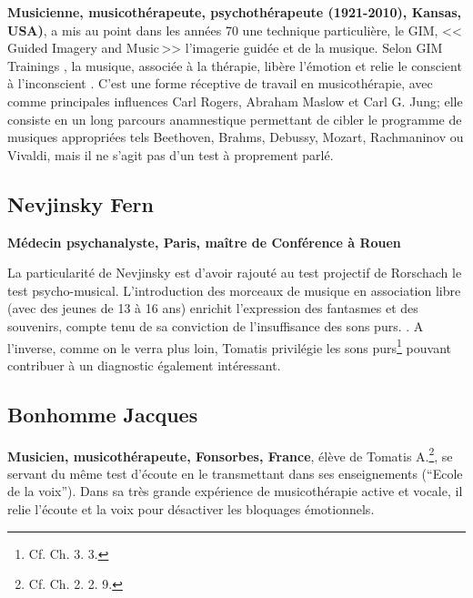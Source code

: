 \textbf{ Musicienne, musicothérapeute, psychothérapeute (1921-2010), Kansas, USA)},
a mis au point dans les années 70
une technique particulière, le GIM, <<\,Guided Imagery and Music\,>>
l'imagerie guidée et de la musique. Selon GIM
Trainings \autocite{gim_site}, la
musique, associée à la thérapie, libère l'émotion et relie le
conscient à l'inconscient \autocite{bonny_gim}.
 C'est une forme réceptive de travail
 en musicothérapie, avec comme principales influences Carl Rogers,
 Abraham Maslow  \autocite{maslow-key}
et Carl G. Jung;
elle  consiste en un long parcours  anamnestique permettant de cibler le programme de musiques appropriées tels Beethoven, Brahms, Debussy,
Mozart, Rachmaninov ou Vivaldi, mais il ne s'agit pas d'un test à proprement parlé.

\subsection{ Nevjinsky Fern}
\textbf{Médecin psychanalyste,
  Paris, maître de Conférence à Rouen}

 La particularité de Nevjinsky est d'avoir rajouté au test projectif de Rorschach le test psycho-musical.
L'introduction des morceaux de musique en association libre (avec
 des jeunes de 13 à 16 ans) enrichit l'expression des fantasmes et des
 souvenirs, compte tenu de sa conviction de l'insuffisance des sons purs.
 \autocite{nevjinsky:adolescence}.
A l'inverse, comme on le verra plus loin, Tomatis
privilégie les sons purs\footnote{Cf. Ch. 3. 3.}  pouvant contribuer à un diagnostic également intéressant.



  \subsection{ Bonhomme Jacques }
  \textbf{Musicien, musicothérapeute,
    Fonsorbes, France}, élève de Tomatis A.\footnote{Cf. Ch. 2. 2. 9. }, se servant du même test
  d'écoute en le transmettant dans ses enseignements (``Ecole de la
  voix''). Dans sa très grande expérience de musicothérapie active et
  vocale, il relie l'écoute et la voix pour désactiver les bloquages
  émotionnels.

